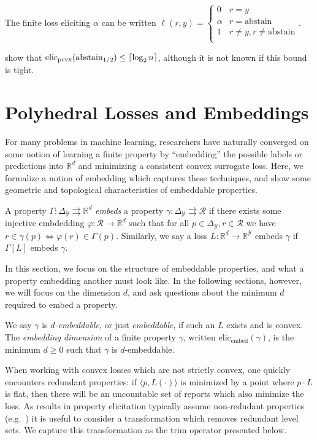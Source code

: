 \documentclass[anon,12pt]{colt2019}
\newcommand{\reals}{\mathbb{R}}
\newcommand{\prop}[1]{\Gamma[#1]}
\newcommand{\elicpoly}{\mathrm{elic}_\mathrm{pcvx}}
\newcommand{\elicembed}{\mathrm{elic}_\mathrm{embed}}
\newcommand{\abstain}[1]{\mathrm{abstain}_{#1}}
\newcommand{\simplex}{\Delta_\Y}
\newcommand{\R}{\mathcal{R}}
\newcommand{\Y}{\mathcal{Y}}
\newcommand{\inprod}[2]{\langle #1, #2 \rangle}%
\newcommand{\toto}{\rightrightarrows}
\DeclarePairedDelimiter\ceil{\lceil}{\rceil}
\begin{document}
The finite loss eliciting $\alpha$ can be written $\ell(r,y) = \begin{cases}
0 & r = y\\
\alpha & r = \text{abstain}\\
1 & r \neq y, r \neq \text{abstain}\\
\end{cases}$.

\cite{ramaswamy2018consistent} show that $\elicpoly(\abstain{1/2}) \leq \ceil{\log_2 n}$, although it is not known if this bound is tight.


\section{Polyhedral Losses and Embeddings}

For many problems in machine learning, researchers have naturally converged on some notion of learning a finite property by ``embedding'' the possible labels or predictions into $\reals^d$ and minimizing a consistent convex surrogate loss.
Here, we formalize a notion of embedding which captures these techniques, and show some geometric and topological characteristics of embeddable properties.

\begin{definition}
  A property $\Gamma : \simplex \toto \reals^d$ \emph{embeds} a property $\gamma : \simplex \toto \R$ if there exists some injective embdedding $\varphi:\R\to\reals^d$ such that for all $p\in\simplex,r\in\R$ we have $r \in \gamma(p) \iff \varphi(r) \in \Gamma(p)$.
  Similarly, we say a loss $L:\reals^d\to\reals^\Y$ embeds $\gamma$ if $\prop{L}$ embeds $\gamma$.
\end{definition}

In this section, we focus on the structure of embeddable properties, and what a property embedding another must look like.
In the following sections, however, we will focus on the dimension $d$, and ask questions about the minimum $d$ required to embed a property.

\begin{definition}
  We say $\gamma$ is \emph{$d$-embeddable}, or just \emph{embeddable}, if such an $L$ exists and is convex.
  The \emph{embedding dimension} of a finite property $\gamma$, written $\elicembed(\gamma)$, is the minimum $d\geq 0$ such that $\gamma$ is $d$-embeddable.
\end{definition}

When working with convex losses which are not strictly convex, one quickly encounters redundant properties: if $\inprod{p}{L(\cdot)}$ is minimized by a point where $p\cdot L$ is flat, then there will be an uncountable set of reports which also minimize the loss.
As results in property elicitation typically assume non-redudant properties (e.g.~\cite{frongillo2014general,frongillo2015elicitation}) it is useful to consider a transformation which removes redundant level sets.
We capture this transformation as the trim operator presented below.
\end{document}
